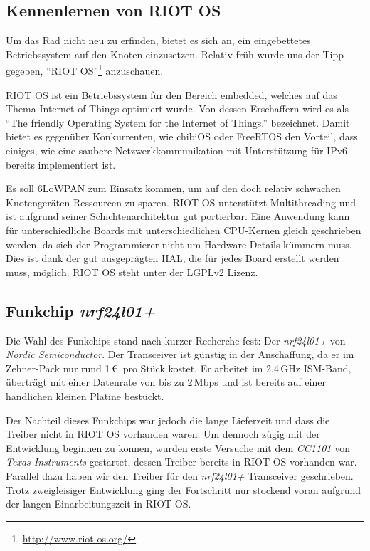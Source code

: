 \documentclass{IEEEtran}
\begin{document}
    \subsection{Kennenlernen von RIOT OS}
    Um das Rad nicht neu zu erfinden, bietet es sich an, ein eingebettetes 
    Betriebssystem auf den Knoten einzusetzen. Relativ früh wurde uns der Tipp 
    gegeben, \enquote{RIOT OS}\footnote{\url{http://www.riot-os.org/}} anzuschauen.
    
    RIOT OS ist ein Betriebssystem für den Bereich embedded, welches auf das 
    Thema Internet of Things optimiert wurde.
    Von dessen Erschaffern wird es als \enquote{The friendly Operating System for the Internet of Things.} bezeichnet.
    Damit bietet es gegenüber Konkurrenten, wie chibiOS oder FreeRTOS den Vorteil, 
    dass einiges, wie eine saubere Netzwerkkommunikation mit Unterstützung für 
    IPv6 bereits implementiert ist. 
    
    Es soll \ac{6LoWPAN} zum Einsatz kommen, um auf den doch relativ schwachen 
    Knotengeräten Ressourcen zu sparen.
    RIOT OS unterstützt Multithreading und ist aufgrund seiner Schichtenarchitektur
    gut portierbar. Eine Anwendung kann für unterschiedliche Boards mit unterschiedlichen
    CPU-Kernen gleich geschrieben werden, da sich der Programmierer nicht um Hardware-Details
    kümmern muss. Dies ist dank der gut ausgeprägten \ac{HAL}, 
    die für jedes Board erstellt werden muss, möglich.
    RIOT OS steht unter der LGPLv2 Lizenz.

    \subsection{Funkchip \emph{nrf24l01+}}
    Die Wahl des Funkchips stand nach kurzer Recherche fest: Der \emph{nrf24l01+} von 
    \emph{Nordic Semiconductor}. Der Transceiver ist günstig in der Anschaffung, da er 
    im Zehner-Pack nur rund 1\,\euro\ pro Stück kostet. Er arbeitet im 2,4\,GHz 
    ISM-Band, überträgt mit einer Datenrate von bis zu 2\,Mbps und ist bereits auf einer handlichen 
    kleinen Platine bestückt.
    
    Der Nachteil dieses Funkchips war jedoch die lange 
    Lieferzeit und dass die Treiber nicht in RIOT OS vorhanden waren.
    Um dennoch zügig mit der Entwicklung beginnen zu können, wurden erste 
    Versuche mit dem \emph{CC1101} von \emph{Texas Instruments} gestartet, dessen Treiber 
    bereits in RIOT OS vorhanden war. Parallel dazu haben wir den Treiber für den 
    \emph{nrf24l01+} Transceiver geschrieben. Trotz zweigleisiger Entwicklung ging der 
    Fortschritt nur stockend voran aufgrund der langen Einarbeitungszeit in RIOT OS.
\end{document}
